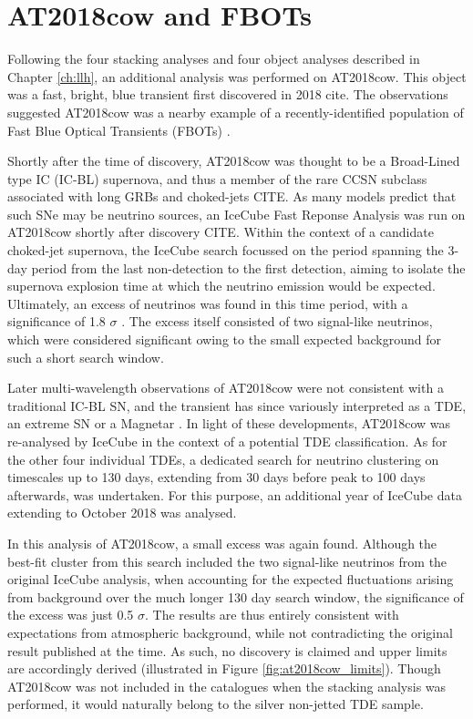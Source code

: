\section{AT2018cow and FBOTs}

Following the four stacking analyses and four object analyses described in Chapter \ref{ch:llh}, an additional analysis was performed on AT2018cow. This object was a fast, bright, blue transient first discovered in 2018 cite. The observations suggested AT2018cow was a nearby example of a recently-identified population of Fast Blue Optical Transients (FBOTs) . 

Shortly after the time of discovery, AT2018cow was thought to be a Broad-Lined type IC (IC-BL) supernova, and thus a member of the rare CCSN subclass associated with long GRBs and choked-jets CITE. As many models predict that such SNe may be neutrino sources, an IceCube Fast Reponse Analysis was run on AT2018cow shortly after discovery CITE. Within the context of a candidate choked-jet supernova, the IceCube search focussed on the period spanning the 3-day period from the last non-detection to the first detection, aiming to isolate the supernova explosion time at which the neutrino emission would be expected. Ultimately, an excess of neutrinos was found in this time period, with a significance of 1.8 $\sigma$ . The excess itself consisted of two signal-like neutrinos, which were considered significant owing to the small expected background for such a short search window.

Later multi-wavelength observations of AT2018cow were not consistent with a traditional IC-BL SN, and the transient has since variously interpreted as a TDE, an extreme SN or a Magnetar . In light of these developments, AT2018cow was re-analysed by IceCube in the context of a potential TDE classification. As for the other four individual TDEs, a dedicated search for neutrino clustering on timescales up to 130 days, extending from 30 days before peak to 100 days afterwards, was undertaken.  For this purpose, an additional year of IceCube data extending to October 2018 was analysed.

In this analysis of AT2018cow, a small excess was again found. Although the best-fit cluster from this search included the two signal-like neutrinos from the original IceCube analysis, when accounting for the expected fluctuations arising from background over the much longer 130 day search window, the significance of the excess was just 0.5 $\sigma$. The results are thus entirely consistent with expectations from atmospheric background, while not contradicting the original result published at the time. As such, no discovery is claimed and upper limits are accordingly derived (illustrated in Figure \ref{fig:at2018cow_limits}). Though AT2018cow was not included in the catalogues when the stacking analysis was performed, it would naturally belong to the silver non-jetted TDE sample. 

